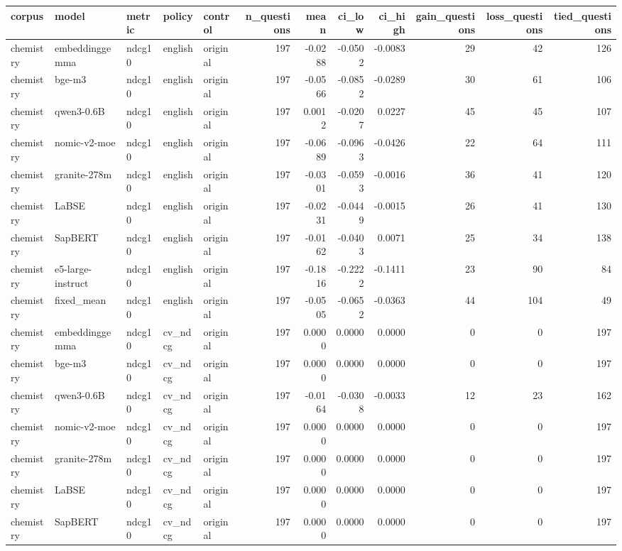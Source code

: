 \begin{tabular}{lllllrrrrrrr}
\toprule
corpus & model & metric & policy & control & n\_questions & mean & ci\_low & ci\_high & gain\_questions & loss\_questions & tied\_questions \\
\midrule
chemistry & embeddinggemma & ndcg10 & english & original & 197 & -0.0288 & -0.0502 & -0.0083 & 29 & 42 & 126 \\
chemistry & bge-m3 & ndcg10 & english & original & 197 & -0.0566 & -0.0852 & -0.0289 & 30 & 61 & 106 \\
chemistry & qwen3-0.6B & ndcg10 & english & original & 197 & 0.0012 & -0.0207 & 0.0227 & 45 & 45 & 107 \\
chemistry & nomic-v2-moe & ndcg10 & english & original & 197 & -0.0689 & -0.0963 & -0.0426 & 22 & 64 & 111 \\
chemistry & granite-278m & ndcg10 & english & original & 197 & -0.0301 & -0.0593 & -0.0016 & 36 & 41 & 120 \\
chemistry & LaBSE & ndcg10 & english & original & 197 & -0.0231 & -0.0449 & -0.0015 & 26 & 41 & 130 \\
chemistry & SapBERT & ndcg10 & english & original & 197 & -0.0162 & -0.0403 & 0.0071 & 25 & 34 & 138 \\
chemistry & e5-large-instruct & ndcg10 & english & original & 197 & -0.1816 & -0.2222 & -0.1411 & 23 & 90 & 84 \\
chemistry & fixed\_mean & ndcg10 & english & original & 197 & -0.0505 & -0.0652 & -0.0363 & 44 & 104 & 49 \\
chemistry & embeddinggemma & ndcg10 & cv\_ndcg & original & 197 & 0.0000 & 0.0000 & 0.0000 & 0 & 0 & 197 \\
chemistry & bge-m3 & ndcg10 & cv\_ndcg & original & 197 & 0.0000 & 0.0000 & 0.0000 & 0 & 0 & 197 \\
chemistry & qwen3-0.6B & ndcg10 & cv\_ndcg & original & 197 & -0.0164 & -0.0308 & -0.0033 & 12 & 23 & 162 \\
chemistry & nomic-v2-moe & ndcg10 & cv\_ndcg & original & 197 & 0.0000 & 0.0000 & 0.0000 & 0 & 0 & 197 \\
chemistry & granite-278m & ndcg10 & cv\_ndcg & original & 197 & 0.0000 & 0.0000 & 0.0000 & 0 & 0 & 197 \\
chemistry & LaBSE & ndcg10 & cv\_ndcg & original & 197 & 0.0000 & 0.0000 & 0.0000 & 0 & 0 & 197 \\
chemistry & SapBERT & ndcg10 & cv\_ndcg & original & 197 & 0.0000 & 0.0000 & 0.0000 & 0 & 0 & 197 \\

\end{tabular}
